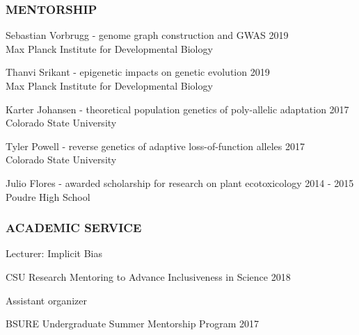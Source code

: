 \documentclass[12pt,english]{article}
\begin{document}
\subsubsection*{MENTORSHIP}
\vspace{-0.5ex}\par
\hspace*{1.0em} Sebastian Vorbrugg -  genome graph construction and GWAS
\hfill
2019\\
\hspace*{2.0em} Max Planck Institute for Developmental Biology

\hspace*{1.0em} Thanvi Srikant - epigenetic impacts on genetic evolution
\hfill
2019\\
\hspace*{2.0em} Max Planck Institute for Developmental Biology

\hspace*{1.0em} Karter Johansen -  theoretical population genetics of poly-allelic adaptation
\hfill
2017\\
\hspace*{2.0em} Colorado State University

\hspace*{1.0em} Tyler Powell - reverse genetics of adaptive loss-of-function alleles
\hfill
2017\\
\hspace*{2.0em} Colorado State University

\hspace*{1.0em} Julio Flores - awarded scholarship for research on plant ecotoxicology
\hfill
2014 - 2015\\
\hspace*{2.0em} Poudre High School

\subsubsection*{ACADEMIC SERVICE}
\vspace{-0.5ex}\par

\hspace*{1.0em} Lecturer: Implicit Bias
\par
\hspace*{2.0em} CSU Research Mentoring to Advance Inclusiveness in Science
\hfill
2018

\hspace*{1.0em} Assistant organizer
\par
\hspace*{2.0em} BSURE Undergraduate Summer Mentorship Program
\hfill
2017
\end{document}
